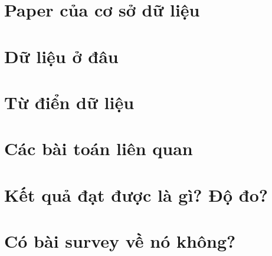 \documentclass{article}
\begin{document}


\newpage

\section{Paper của cơ sở dữ liệu}


\section{Dữ liệu ở đâu}


\section{Từ điển dữ liệu}


\section{Các bài toán liên quan}


\section{Kết quả đạt được là gì? Độ đo?}


\section{Có bài survey về nó không?}

\end{document}
